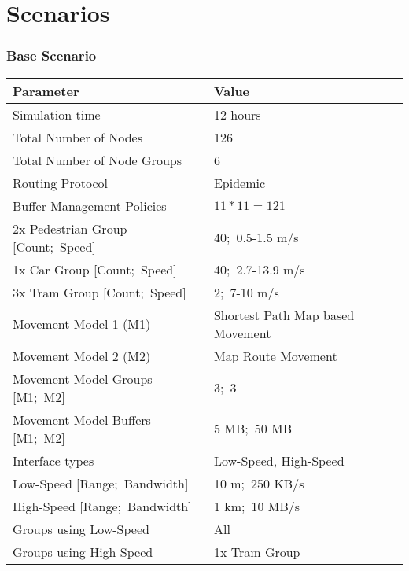 \section{Scenarios}


\begin{frame}
  \frametitle{Base Scenario}
	\begin{table}[!ht]	
		\small
	    \begin{tabular}{ | p{} | p{} | }    
	    \hline
	    Parameter & Value \\ \hline \hline 
	    \hline
	    Simulation time & 12 hours \\ \hline
	    Total Number of Nodes & 126 \\ \hline
	    Total Number of Node Groups & 6 \\ \hline \hline    
	    Routing Protocol & Epidemic \\ \hline
	    Buffer Management Policies & $11 * 11 = 121$ \\ \hline
	    2x Pedestrian Group [Count;~Speed] & 40;~0.5-1.5 m/s  \\ \hline
		1x Car Group [Count;~Speed] & 40;~2.7-13.9 m/s  \\ \hline
		3x Tram Group [Count;~Speed] & 2;~7-10 m/s  \\ \hline \hline
	    Movement Model 1 (M1) & Shortest Path Map based Movement \\ \hline
	    Movement Model 2 (M2) & Map Route Movement \\ \hline    
	    Movement Model Groups [M1;~M2] &  3;~3 \\ \hline
	    Movement Model Buffers [M1;~M2] & 5 MB;~50 MB \\ \hline \hline
	    Interface types & Low-Speed, High-Speed \\ \hline
	    Low-Speed [Range;~Bandwidth] & 10 m;~250 KB/s \\ \hline
	    High-Speed [Range;~Bandwidth] & 1 km;~10 MB/s \\ \hline
	    Groups using Low-Speed & All \\ \hline
	    Groups using High-Speed & 1x Tram Group \\ \hline \hline    
	    \end{tabular}
	\end{table}
\end{frame}


